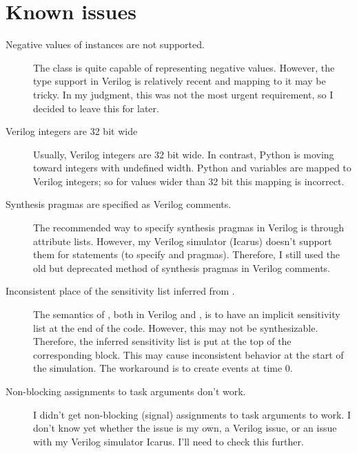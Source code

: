 \section{Known issues\label{conv-issues}}
\begin{description}

\item[Negative values of  instances are not supported.]
The  class is quite capable of representing negative
values. However, the  type support in Verilog is
relatively recent and mapping to it may be tricky. In my judgment,
this was not the most urgent requirement, so
I decided to leave this for later.

\item[Verilog integers are 32 bit wide]
Usually, Verilog integers are 32 bit wide. In contrast, Python is
moving toward integers with undefined width. Python  
and  variables are mapped to Verilog integers; so for values
wider than 32 bit this mapping is incorrect.

\item[Synthesis pragmas are specified as Verilog comments.] The recommended
way to specify synthesis pragmas in Verilog is through attribute
lists. However, my Verilog simulator (Icarus) doesn't support them
for  statements (to specify  and
 pragmas). Therefore, I still used the old
but deprecated method of synthesis pragmas in Verilog comments.

\item[Inconsistent place of the sensitivity list inferred from .]
The semantics of , both in Verilog and \myhdl{}, is to
have an implicit sensitivity list at the end of the code. However, this
may not be synthesizable. Therefore, the inferred sensitivity list is
put at the top of the corresponding  block.
This may cause inconsistent behavior at the start of the
simulation. The workaround is to create events at time 0.

\item[Non-blocking assignments to task arguments don't work.] 
I didn't get non-blocking (signal) assignments to task arguments to
work.  I don't know yet whether the issue is my own, a Verilog issue,
or an issue with my Verilog simulator Icarus. I'll need to check this
further.

\end{description}
